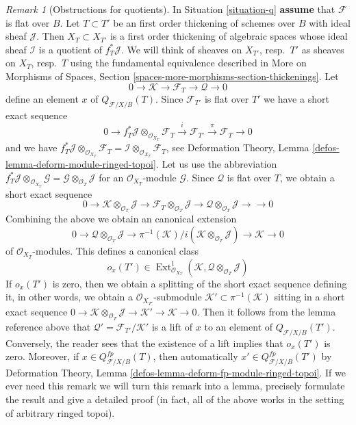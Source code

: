 \documentclass{stacks-project}
\theoremstyle{plain}
\theoremstyle{definition}
\theoremstyle{remark}
\newtheorem{remark}[subsection]{Remark}
\numberwithin{equation}{subsection}
\def\Ext{\mathop{\mathrm{Ext}}\nolimits}
\begin{document}
\begin{remark}[Obstructions for quotients]
\label{remark-q-obs}
In Situation \ref{situation-q} {\bf assume} that $\mathcal{F}$ is flat
over $B$. Let $T \subset T'$ be an first order
thickening of schemes over $B$ with ideal sheaf $\mathcal{J}$. Then
$X_T \subset X_{T'}$ is a first order thickening of algebraic spaces
whose ideal sheaf $\mathcal{I}$ is a quotient of $f_T^*\mathcal{J}$.
We will think of sheaves on $X_{T'}$, resp.\ $T'$ as sheaves on
$X_T$, resp.\ $T$ using the fundamental equivalence described in
More on Morphisms of Spaces, Section
\ref{spaces-more-morphisms-section-thickenings}.
Let
$$
0 \to \mathcal{K} \to \mathcal{F}_T \to \mathcal{Q} \to 0
$$
define an element $x$ of $Q_{\mathcal{F}/X/B}(T)$. Since $\mathcal{F}_{T'}$
is flat over $T'$ we have a short exact sequence
$$
0 \to f_T^*\mathcal{J} \otimes_{\mathcal{O}_{X_T}} \mathcal{F}_T
\xrightarrow{i} \mathcal{F}_{T'} \xrightarrow{\pi} \mathcal{F}_T \to 0
$$
and we have
$f_T^*\mathcal{J} \otimes_{\mathcal{O}_{X_T}} \mathcal{F}_T =
\mathcal{I} \otimes_{\mathcal{O}_{X_T}} \mathcal{F}_T$, see
Deformation Theory, Lemma \ref{defos-lemma-deform-module-ringed-topoi}.
Let us use the abbreviation
$
f_T^*\mathcal{J} \otimes_{\mathcal{O}_{X_T}} \mathcal{G} =
\mathcal{G} \otimes_{\mathcal{O}_T} \mathcal{J}
$
for an $\mathcal{O}_{X_T}$-module $\mathcal{G}$.
Since $\mathcal{Q}$ is flat over $T$, we obtain a short exact sequence
$$
0 \to
\mathcal{K} \otimes_{\mathcal{O}_T} \mathcal{J} \to
\mathcal{F}_T \otimes_{\mathcal{O}_T} \mathcal{J} \to
\mathcal{Q} \otimes_{\mathcal{O}_T} \mathcal{J} \to
\to 0
$$
Combining the above we obtain an canonical extension
$$
0 \to \mathcal{Q} \otimes_{\mathcal{O}_T} \mathcal{J} \to
\pi^{-1}(\mathcal{K})/i(\mathcal{K} \otimes_{\mathcal{O}_T} \mathcal{J}) \to
\mathcal{K} \to 0
$$
of $\mathcal{O}_{X_T}$-modules. This defines a canonical class
$$
o_x(T') \in
\Ext^1_{\mathcal{O}_{X_T}}(\mathcal{K},
\mathcal{Q} \otimes_{\mathcal{O}_T} \mathcal{J})
$$
If $o_x(T')$ is zero, then we obtain a splitting of the short
exact sequence defining it, in other words, we obtain a
$\mathcal{O}_{X_{T'}}$-submodule
$\mathcal{K}' \subset \pi^{-1}(\mathcal{K})$ sitting in a short
exact sequence
$0 \to \mathcal{K} \otimes_{\mathcal{O}_T} \mathcal{J} \to
\mathcal{K}' \to \mathcal{K} \to 0$.
Then it follows from the lemma reference above that
$\mathcal{Q}' = \mathcal{F}_{T'}/\mathcal{K}'$
is a lift of $x$ to an element of $Q_{\mathcal{F}/X/B}(T')$.
Conversely, the reader sees that the existence of
a lift implies that $o_x(T')$ is zero. Moreover, if
$x \in Q_{\mathcal{F}/X/B}^{fp}(T)$, then automatically
$x' \in Q_{\mathcal{F}/X/B}^{fp}(T')$ by
Deformation Theory, Lemma \ref{defos-lemma-deform-fp-module-ringed-topoi}.
If we ever need this
remark we will turn this remark into a lemma, precisely formulate
the result and give a detailed proof (in fact, all of the above
works in the setting of arbitrary ringed topoi).
\end{remark}
\end{document}
